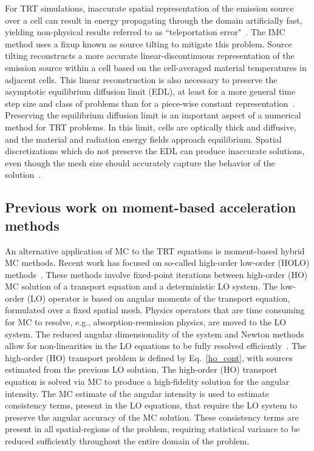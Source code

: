 \documentclass[11pt]{article}
\begin{document}


For TRT simulations, inaccurate spatial representation of the emission source over a cell can result in
energy propagating through the domain artificially fast, yielding non-physical
results referred to as ``teleportation error"~\cite{teleportation}.  The IMC method uses a fixup known as source tilting
to mitigate this problem.  Source tilting reconstructs a more accurate
linear-discontinuous representation of the
emission source within a cell based on the cell-averaged material temperatures in adjacent
cells. This linear reconstruction is also necessary to preserve the asymptotic equilibrium diffusion
limit (EDL), at least for a more general time step size and class of problems than for a piece-wise constant representation~\cite{diff_limit_imc}.  Preserving the equilibrium diffusion limit is an
important aspect of a numerical method for TRT problems. 
In this limit, cells are optically thick and diffusive, and the material
and radiation energy fields approach equilibrium.
Spatial discretizations which do not preserve the EDL can produce inaccurate
solutions, even though the mesh size should accurately capture the behavior of the solution~\cite{morel_newton}.

\subsection{Previous work on moment-based acceleration methods}

An alternative application of MC to the TRT equations is moment-based hybrid MC methods.
Recent work has focused on so-called high-order low-order (HOLO)
methods~\cite{willert,park,rmc,ans_2014}. These methods involve fixed-point
iterations between high-order (HO) MC solution of a transport equation and a deterministic LO
system.  The low-order (LO)
operator is based on angular moments of the transport equation, formulated over a fixed
spatial mesh.  Physics operators that are time consuming for MC
to resolve, e.g., absorption-reemission physics, are moved to the LO
system.  The reduced angular dimensionality of the system and Newton methods allow for non-linearities in the LO equations to be fully
resolved efficiently~\cite{willert,park}.  The high-order (HO) transport problem is defined by 
Eq.~\eqref{ho_cont}, with sources estimated from the previous LO solution.  
The high-order (HO) transport equation is solved via MC to produce a high-fidelity solution for
the angular intensity.  The MC estimate of the angular intensity is used to estimate
consistency terms,
present in the LO equations, that require the LO system to preserve the angular accuracy of the
MC solution.   
These consistency terms are present in all spatial-regions of the problem, requiring
statistical variance to be reduced sufficiently throughout the entire domain of the
problem. 
\end{document}
